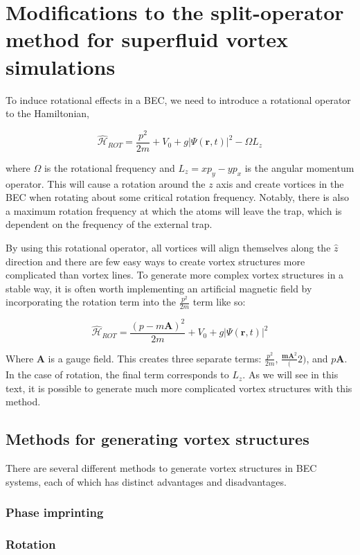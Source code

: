 \section{Modifications to the split-operator method for superfluid vortex simulations}

To induce rotational effects in a BEC, we need to introduce a rotational operator to the Hamiltonian,

$$
\mathcal{\hat H}_{ROT} = \frac{p^2}{2m} + V_0 + g|\Psi(\mathbf{r},t)|^2 - \Omega L_z
$$

where $\Omega$ is the rotational frequency and $L_z = xp_y - yp_x$ is the angular momentum operator.
This will cause a rotation around the $z$ axis and create vortices in the BEC when rotating about some critical rotation frequency.
Notably, there is also a maximum rotation frequency at which the atoms will leave the trap, which is dependent on the frequency of the external trap.

By using this rotational operator, all vortices will align themselves along the $\hat z$ direction and there are few easy ways to create vortex structures more complicated than vortex lines.
To generate more complex vortex structures in a stable way, it is often worth implementing an artificial magnetic field by incorporating the rotation term into the $\frac{p^2}{2m}$ term like so:

$$
\mathcal{\hat H}_{ROT} = \frac{(p-m\mathbf{A})^2}{2m} + V_0 + g|\Psi(\mathbf{r},t)|^2
$$

Where $\mathbf{A}$ is a gauge field.
This creates three separate terms: $\frac{p^2}{2m}$, $\frac{\mathbf{mA}^2}(2)$, and $p\mathbf{A}$.
In the case of rotation, the final term corresponds to $L_z$.
As we will see in this text, it is possible to generate much more complicated vortex structures with this method.

\subsection{Methods for generating vortex structures}

There are several different methods to generate vortex structures in BEC systems, each of which has distinct advantages and disadvantages.

\subsubsection{Phase imprinting}

\subsubsection{Rotation}

